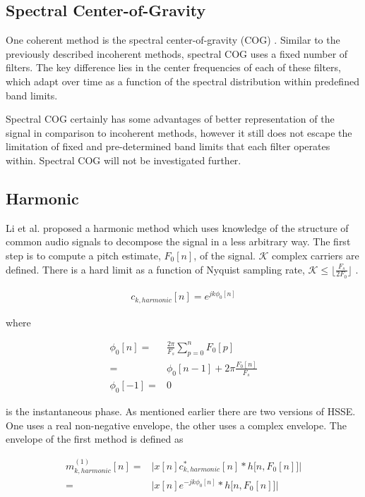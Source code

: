 \documentclass [11pt, proquest,oneside] {ganter_thesis}[2015/03/03]
\begin{document}
\subsection{Spectral Center-of-Gravity}

One coherent method is the spectral center-of-gravity (COG) \cite{clark2009time}.  Similar to the previously described incoherent methods, spectral COG uses a fixed number of filters.  The key difference lies in the center frequencies of each of these filters, which adapt over time as a function of the spectral distribution within predefined band limits.

Spectral COG certainly has some advantages of better representation of the signal in comparison to incoherent methods, however it still does not escape the limitation of fixed and pre-determined band limits that each filter operates within.  Spectral COG will not be investigated further.

\subsection{Harmonic}

Li et al. \cite{li2010harmonic} proposed a harmonic method which uses knowledge of the structure of common audio signals to decompose the signal in a less arbitrary way.  The first step is to compute a pitch estimate, $F_0[n]$, of the signal.  $\mathcal{K}$ complex carriers are defined.  There is a hard limit as a function of Nyquist sampling rate, $\mathcal{K} \leq  \lfloor \frac{F_s}{2F_0} \rfloor$ \cite{clark2010modulation}.

\begin{align}
c_{k,harmonic}[n] = e^{jk\phi_0 [n]}
\end{align}

where

\begin{align}
\phi_0[n] =& \frac{2\pi}{F_s} \sum_{p=0}^{n} F_0[p] \nonumber \\
\label{eq:harmonic_phi0}
=& \phi_0[n - 1] + 2\pi \frac{F_0[n]}{F_s} \\
\phi_0[-1] =& 0 \nonumber
\end{align}

is the instantaneous phase.  As mentioned earlier there are two versions of HSSE. One uses a real non-negative envelope, the other uses a complex envelope.  The envelope of the first method is defined as

\begin{align}
m^{(1)}_{k,harmonic}[n] =& \Big| x[n] c_{k,harmonic}^*[n] * h\big[n, F_0[n] \big] \Big| \nonumber \\
=& \Big| x[n] e^{-jk\phi_0 [n]} * h\big[n, F_0[n] \big] \Big|
\end{align}
\end{document}
